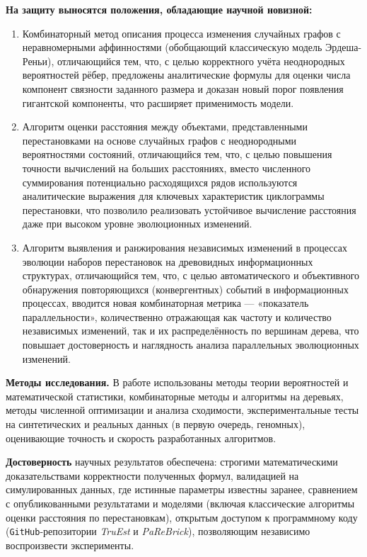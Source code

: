 \textbf{На защиту выносятся положения, обладающие научной новизной:}
\begin{enumerate}[label={\arabic*.}]
    \item Комбинаторный метод описания процесса изменения случайных графов с неравномерными аффинностями (обобщающий классическую модель Эрдеша-Реньи), отличающийся тем, что, с целью корректного учёта неоднородных вероятностей рёбер, предложены аналитические формулы для оценки числа компонент связности заданного размера и доказан новый порог появления гигантской компоненты, что расширяет применимость модели.
    \item Алгоритм оценки расстояния между объектами, представленными перестановками на основе случайных графов с неоднородными вероятностями состояний, отличающийся тем, что, с целью повышения точности вычислений на больших расстояниях, вместо численного суммирования потенциально расходящихся рядов используются аналитические выражения для ключевых характеристик циклограммы перестановки, что позволило реализовать устойчивое вычисление расстояния даже при высоком уровне эволюционных изменений.
    \item Алгоритм выявления и ранжирования независимых изменений в процессах эволюции наборов перестановок на древовидных информационных структурах, отличающийся тем, что, с целью автоматического и объективного обнаружения повторяющихся (конвергентных) событий в информационных процессах, вводится новая комбинаторная метрика — «показатель параллельности», количественно отражающая как частоту и количество независимых изменений, так и их распределённость по вершинам дерева, что повышает достоверность и наглядность анализа параллельных эволюционных изменений.
\end{enumerate}

\textbf{Методы исследования.} 
В работе использованы методы теории вероятностей и математической статистики, комбинаторные методы и алгоритмы на деревьях, методы численной оптимизации и анализа сходимости, экспериментальные тесты на синтетических и реальных данных (в первую очередь, геномных), оценивающие точность и скорость разработанных алгоритмов.

\textbf{Достоверность} научных результатов обеспечена: строгими математическими доказательствами корректности полученных формул, валидацией на симулированных данных, где истинные параметры известны заранее, сравнением с опубликованными результатами и моделями (включая классические алгоритмы оценки расстояния по перестановкам), открытым доступом к программному коду (\texttt{GitHub}-репозитории \emph{TruEst} и \emph{PaReBrick}), позволяющим независимо воспроизвести эксперименты.


